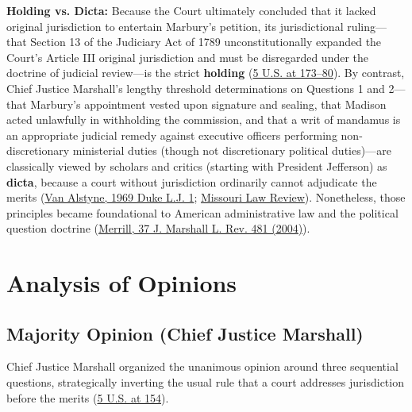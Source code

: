 \documentclass[12pt]{article}
\begin{document}
\textbf{Holding vs. Dicta:} Because the Court ultimately concluded that it lacked original jurisdiction to entertain Marbury's petition, its jurisdictional ruling---that Section 13 of the Judiciary Act of 1789 unconstitutionally expanded the Court's Article III original jurisdiction and must be disregarded under the doctrine of judicial review---is the strict \textbf{holding} (\href{https://supreme.justia.com/cases/federal/us/5/137/}{5 U.S. at 173--80}). By contrast, Chief Justice Marshall's lengthy threshold determinations on Questions 1 and 2---that Marbury's appointment vested upon signature and sealing, that Madison acted unlawfully in withholding the commission, and that a writ of mandamus is an appropriate judicial remedy against executive officers performing non-discretionary ministerial duties (though not discretionary political duties)---are classically viewed by scholars and critics (starting with President Jefferson) as \textbf{dicta}, because a court without jurisdiction ordinarily cannot adjudicate the merits (\href{https://scholarship.law.duke.edu/dlj/vol18/iss1/1/}{Van Alstyne, 1969 Duke L.J. 1}; \href{https://scholarship.law.missouri.edu/cgi/viewcontent.cgi?article=4238&context=mlr}{Missouri Law Review}). Nonetheless, those principles became foundational to American administrative law and the political question doctrine (\href{https://scholarship.law.columbia.edu/context/faculty_scholarship/article/1878/viewcontent/37_J._Marshall_L._Rev._481.pdf}{Merrill, 37 J. Marshall L. Rev. 481 (2004)}).

\section{Analysis of Opinions}

\subsection{Majority Opinion (Chief Justice Marshall)}

Chief Justice Marshall organized the unanimous opinion around three sequential questions, strategically inverting the usual rule that a court addresses jurisdiction before the merits (\href{https://supreme.justia.com/cases/federal/us/5/137/}{5 U.S. at 154}).
\end{document}
